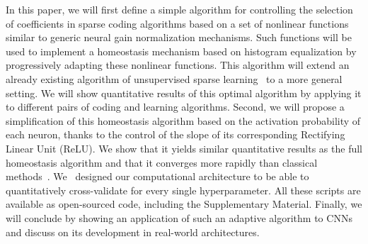 \documentclass[vision,article,accept,oneauthor,pdftex]{Definitions/mdpi}
\begin{document}
In this paper, we will first define a simple algorithm for controlling the selection of coefficients in sparse coding algorithms based on a set of nonlinear functions similar to generic neural gain normalization mechanisms. Such functions will be used to implement a homeostasis mechanism based on histogram equalization by progressively adapting these nonlinear functions. This algorithm will extend an already existing algorithm of unsupervised sparse learning~\citep{Perrinet10shl} to a more general setting. We will show quantitative results of this optimal algorithm by applying it to different pairs of coding and learning algorithms. Second, we will propose a simplification of this homeostasis algorithm based on the activation probability of each neuron, thanks to the control of the slope of its corresponding Rectifying Linear Unit (ReLU). We show that it yields similar quantitative results as the full homeostasis algorithm and that it converges more rapidly than classical methods~\citep{Olshausen97, Sandin17}. We~ designed our computational architecture to be able to quantitatively cross-validate for every single hyperparameter. All these scripts are available as open-sourced code, including the {Supplementary Material}. %
Finally, we will conclude by showing an application of such an adaptive algorithm to CNNs and discuss on its development in real-world architectures.
%
%
\end{document}
